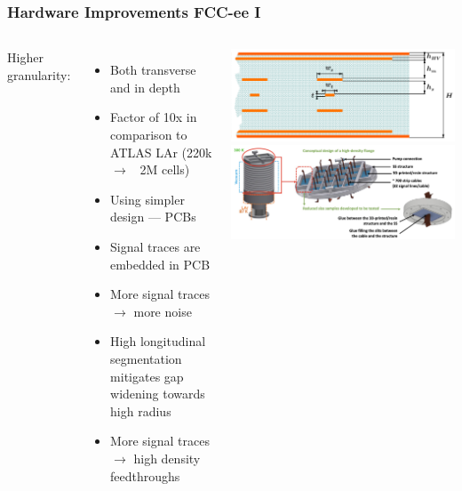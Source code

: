 \documentclass[aspectratio=169]{beamer}
\newcommand{\bluetext}[1]{%
  \textcolor{myBlue}{#1}
}
\begin{document}
\begin{frame}
  \frametitle{Hardware Improvements FCC-ee I}

  \begin{columns}[c]

    \bluetext{Higher granularity:}
    \begin{itemize}
      \item Both transverse and in depth
      \item Factor of 10x in comparison to ATLAS LAr (220k $\rightarrow$ ~2M
            cells)
      \item Using simpler design --- PCBs
      \item Signal traces are embedded in PCB
      \item More signal traces $\rightarrow$ more noise
      \item High longitudinal segmentation mitigates gap widening towards high
            radius
      \item More signal traces $\rightarrow$ high density feedthroughs
    \end{itemize}


    \begin{center}
      \includegraphics[width=\linewidth]{figures/fcc-lar-electrodes.png}\\[1em]
      \includegraphics[width=\linewidth]{figures/fcc-lar-feedthroughs.png}
    \end{center}
  \end{columns}
\end{frame}
\end{document}
